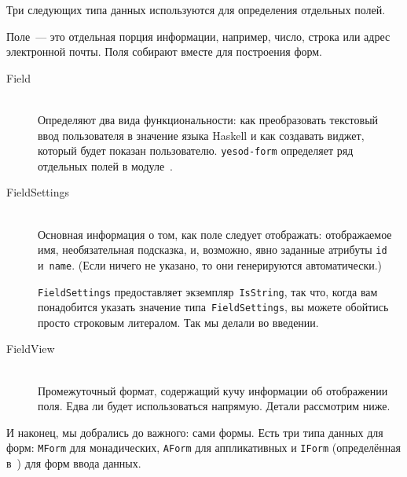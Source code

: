 Три следующих типа данных используются для определения отдельных полей.

\begin{remark}
Поле~--- это отдельная порция информации, например, число, строка или адрес
электронной почты. Поля собирают вместе для построения форм.
\end{remark}

\begin{description}
    \item[Field] \hfill \\
        Определяют два вида функциональности: как преобразовать текстовый ввод
        пользователя в значение языка Haskell и как создавать виджет, который
        будет показан пользователю.  \texttt{yesod-form} определяет ряд
        отдельных полей в
        модуле~.

    \item[FieldSettings] \hfill \\
        Основная информация о том, как поле следует отображать: отображаемое имя,
        необязательная подсказка, и, возможно, явно заданные атрибуты
        \lstinline'id' и~\lstinline'name'. (Если ничего не указано, то они
        генерируются автоматически.)

        \begin{remark}
            \lstinline'FieldSettings' предоставляет
            экземпляр~\lstinline'IsString', так что, когда вам понадобится
            указать значение типа~\lstinline'FieldSettings', вы можете
            обойтись просто строковым литералом. Так мы делали во введении.
        \end{remark}

    \item[FieldView] \hfill \\
        Промежуточный формат, содержащий кучу информации об отображении поля.
        Едва ли будет использоваться напрямую. Детали рассмотрим ниже.
\end{description}

И наконец, мы добрались до важного: сами формы. Есть три типа данных для форм:
\lstinline'MForm' для монадических, \lstinline'AForm' для аппликативных и
\lstinline'IForm' (определённая
в~)
для форм ввода данных.

